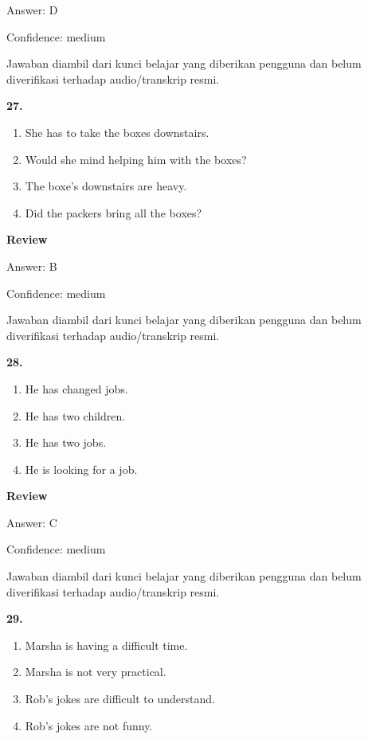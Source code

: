 \documentclass[12pt]{article}
\begin{document}
Answer: D\par
Confidence: medium\par
Jawaban diambil dari kunci belajar yang diberikan pengguna dan belum diverifikasi terhadap audio/transkrip resmi.\par
\endgroup
\par
\vspace{0.25\baselineskip}
\noindent\textbf{27.}
\begin{enumerate}[label=(\Alph*),leftmargin=*,itemsep=0.2em]
\item She has to take the boxes downstairs.
\item Would she mind helping him with the boxes?
\item The boxe's downstairs are heavy.
\item Did the packers bring all the boxes?
\end{enumerate}
\par
\begingroup
\setlength{\parskip}{0pt}
\setlength{\parindent}{0pt}
\textbf{Review}\par
Answer: B\par
Confidence: medium\par
Jawaban diambil dari kunci belajar yang diberikan pengguna dan belum diverifikasi terhadap audio/transkrip resmi.\par
\endgroup
\par
\vspace{0.25\baselineskip}
\noindent\textbf{28.}
\begin{enumerate}[label=(\Alph*),leftmargin=*,itemsep=0.2em]
\item He has changed jobs.
\item He has two children.
\item He has two jobs.
\item He is looking for a job.
\end{enumerate}
\par
\begingroup
\setlength{\parskip}{0pt}
\setlength{\parindent}{0pt}
\textbf{Review}\par
Answer: C\par
Confidence: medium\par
Jawaban diambil dari kunci belajar yang diberikan pengguna dan belum diverifikasi terhadap audio/transkrip resmi.\par
\endgroup
\par
\vspace{0.25\baselineskip}
\noindent\textbf{29.}
\begin{enumerate}[label=(\Alph*),leftmargin=*,itemsep=0.2em]
\item Marsha is having a difficult time.
\item Marsha is not very practical.
\item Rob's jokes are difficult to understand.
\item Rob's jokes are not funny.
\end{enumerate}
\end{document}
